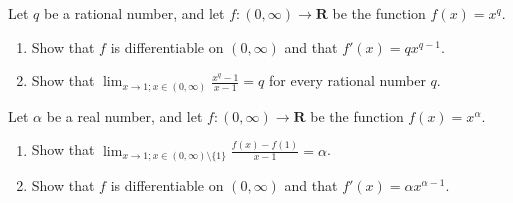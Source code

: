 \begin{exercise}\label{ex 10.4.2}
    Let \(q\) be a rational number, and let \(f : (0, \infty) \to \mathbf{R}\) be the function \(f(x) = x^q\).
    \begin{enumerate}
        \item Show that \(f\) is differentiable on \((0, \infty)\) and that \(f'(x) = q x^{q - 1}\).
        \item Show that \(\lim_{x \to 1 ; x \in (0, \infty)} \frac{x^q - 1}{x - 1} = q\) for every rational number \(q\).
    \end{enumerate}
\end{exercise}

\begin{exercise}\label{ex 10.4.3}
    Let \(\alpha\) be a real number, and let \(f : (0, \infty) \to \mathbf{R}\) be the function \(f(x) = x^{\alpha}\).
    \begin{enumerate}
        \item Show that \(\lim_{x \to 1 ; x \in (0, \infty) \setminus \{1\}} \frac{f(x) - f(1)}{x - 1} = \alpha\).
        \item Show that \(f\) is differentiable on \((0, \infty)\) and that \(f'(x) = \alpha x^{\alpha - 1}\).
    \end{enumerate}
\end{exercise}